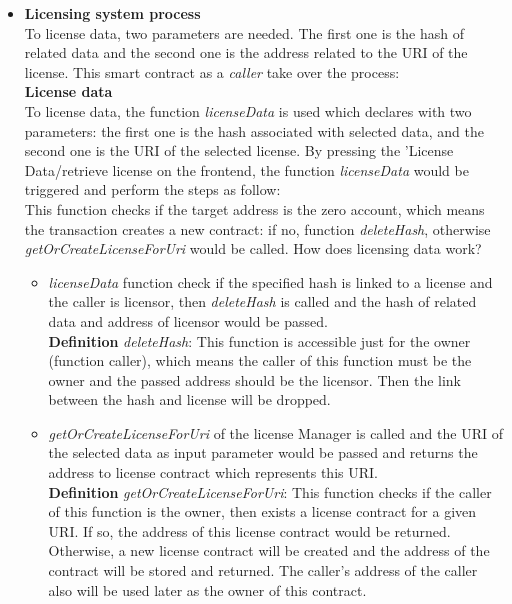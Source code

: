 \begin{itemize}
	\item \textbf{Licensing system process} \\
	To license data, two parameters are needed. The first one is the hash of related data and the second one is the address related to the URI of the license. This smart contract as a \textit{caller} take over the process: \\
	\textbf{License data} \\
	To license data, the function \textit{licenseData} is used which declares with two parameters: the first one is the hash associated with selected data, and the second one is the URI of the selected license. By pressing the 'License Data/retrieve license on the frontend, the function
	\textit{licenseData} would be triggered and perform the steps as follow: \\
	This function checks if the target address is the zero account, which means the transaction creates a new contract: 
	if no, function \textit{deleteHash}, otherwise \textit{getOrCreateLicenseForUri} would be called. How does licensing data work? \\
	\begin{itemize}
		\item \textit{licenseData} function check if the specified hash is linked to a license and the caller is licensor, then \textit{deleteHash} is called and the hash of related data and address of licensor would be passed. \\
		\hspace{1cm} \textbf{Definition} \textit{deleteHash}: This function is accessible just for the owner (function caller), which means the caller of this function must be the owner and the passed address should be the licensor. Then the link between the hash and license will be dropped.
		\item \textit{getOrCreateLicenseForUri} of the license Manager is called and the URI of the selected data as input parameter would be passed and returns the address to license contract which represents this URI.\\
		\hspace{1cm} \textbf{Definition} \textit{getOrCreateLicenseForUri}: This function checks if the caller of this function is the owner, then exists a license contract for a given URI. If so, the address of this license contract would be returned. Otherwise, a new license contract will be created and the address of the contract will be stored and returned. The caller's address of the caller also will be used later as the owner of this contract.

\end{itemize}
\end{itemize}
